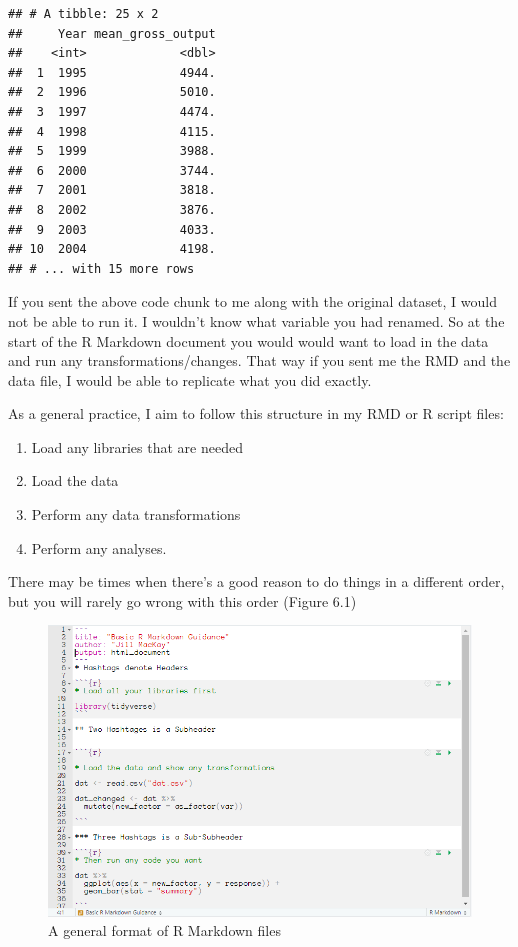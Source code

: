 \documentclass[
]{book}
\providecommand{\tightlist}{%
  \setlength{\itemsep}{0pt}\setlength{\parskip}{0pt}}
\begin{document}
\begin{verbatim}
## # A tibble: 25 x 2
##     Year mean_gross_output
##    <int>             <dbl>
##  1  1995             4944.
##  2  1996             5010.
##  3  1997             4474.
##  4  1998             4115.
##  5  1999             3988.
##  6  2000             3744.
##  7  2001             3818.
##  8  2002             3876.
##  9  2003             4033.
## 10  2004             4198.
## # ... with 15 more rows
\end{verbatim}

If you sent the above code chunk to me along with the original dataset, I would not be able to run it. I wouldn't know what variable you had renamed. So at the start of the R Markdown document you would would want to load in the data and run any transformations/changes. That way if you sent me the RMD and the data file, I would be able to replicate what you did exactly.

As a general practice, I aim to follow this structure in my RMD or R script files:

\begin{enumerate}
\def\labelenumi{\arabic{enumi}.}
\tightlist
\item
  Load any libraries that are needed
\item
  Load the data
\item
  Perform any data transformations
\item
  Perform any analyses.
\end{enumerate}

There may be times when there's a good reason to do things in a different order, but you will rarely go wrong with this order (Figure 6.1)

\begin{figure}

{\centering \includegraphics[width=11.5in]{images/06_workflows/example_workflow} 

}

\caption{A general format of R Markdown files}\label{fig:unnamed-chunk-105}
\end{figure}
\end{document}
